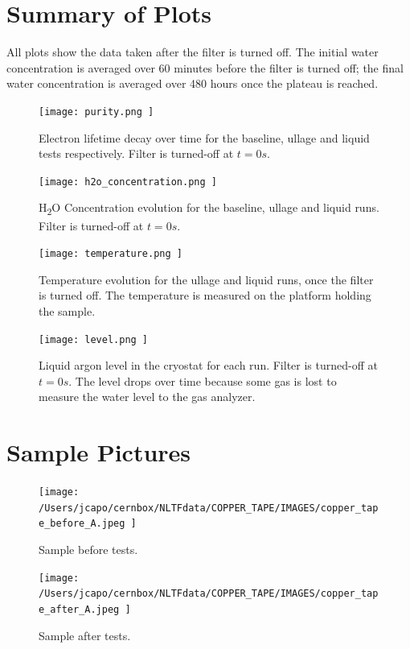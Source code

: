 \documentclass[12pt]{article}
\begin{document}
\section*{Summary of Plots}

All plots show the data taken after the filter is turned off. The initial water concentration is averaged over 60 minutes before the filter is turned off; the final water concentration is averaged over 480 hours once the plateau is reached.

\begin{figure}[H]
    \centering
    \texttt{[image:  purity.png ]}
    \centering
    \caption{Electron lifetime decay over time for the baseline, ullage and liquid tests respectively. Filter is turned-off at $t=0 s$.}
    \label{fig:purity}
\end{figure}

\begin{figure}[H]
    \centering
    \texttt{[image:  h2o\_concentration.png ]}
    \centering
    \caption{H\textsubscript{2}O Concentration evolution for the baseline, ullage and liquid runs. Filter is turned-off at $t=0 s$.}
    \label{fig:h2o}
\end{figure}

\begin{figure}[H]
    \centering
    \texttt{[image:  temperature.png ]}
    \centering
    \caption{Temperature evolution for the ullage and liquid runs, once the filter is turned off. The temperature is measured on the platform holding the sample.}
    \label{fig:temperature}
\end{figure}

\begin{figure}[H]
    \centering
    \texttt{[image:  level.png ]}
    \centering
    \caption{Liquid argon level in the cryostat for each run. Filter is turned-off at $t=0 s$. The level drops over time because some gas is lost to measure the water level to the gas analyzer.}
    \label{fig:level}
\end{figure}

\section*{Sample Pictures}
\label{sec:pictures}

\begin{figure}[H]
    \centering
    \begin{minipage}{\textwidth}
        \centering
        \texttt{[image:  /Users/jcapo/cernbox/NLTFdata/COPPER\_TAPE/IMAGES/copper\_tape\_before\_A.jpeg ]}
        \centering
        \caption{Sample before tests.}
        \label{fig:sample_before}
    \end{minipage}

    \vspace{0.02\textheight}

    \begin{minipage}{\textwidth}
        \centering
        \texttt{[image:  /Users/jcapo/cernbox/NLTFdata/COPPER\_TAPE/IMAGES/copper\_tape\_after\_A.jpeg ]}
        \centering
        \caption{Sample after tests.}
        \label{fig:sample_after}
    \end{minipage}
\end{figure}
\end{document}
